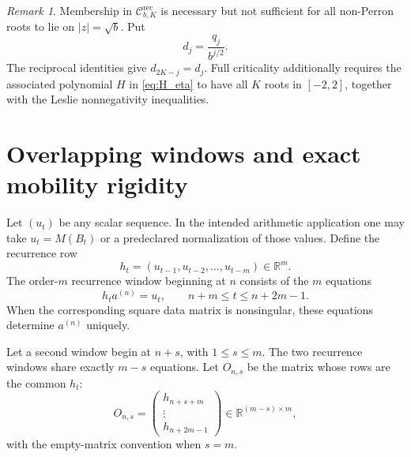 \documentclass[11pt]{amsart}
\numberwithin{equation}{section}
\theoremstyle{plain}
\theoremstyle{definition}
\theoremstyle{remark}
\newtheorem{remark}[theorem]{Remark}
\begin{document}
\begin{remark}
\label{rem:reciprocal_not_full_critical}
Membership in $\mathcal C^{\mathrm{rec}}_{b,K}$ is necessary but not sufficient for all non-Perron roots to lie on $|z|=\sqrt b$.  Put
\begin{equation}
d_j=\frac{q_j}{b^{j/2}}.
\label{eq:d_from_q}
\end{equation}
The reciprocal identities give $d_{2K-j}=d_j$.  Full criticality additionally requires the associated polynomial $H$ in \eqref{eq:H_eta} to have all $K$ roots in $[-2,2]$, together with the Leslie nonnegativity inequalities.
\end{remark}

\section{Overlapping windows and exact mobility rigidity}
\label{sec:overlap_rigidity}

Let $(u_t)$ be any scalar sequence.  In the intended arithmetic application one may take $u_t=M(B_t)$ or a predeclared normalization of those values.  Define the recurrence row
\begin{equation}
h_t=(u_{t-1},u_{t-2},\ldots,u_{t-m})\in\mathbb R^m.
\label{eq:recurrence_row}
\end{equation}
The order-$m$ recurrence window beginning at $n$ consists of the $m$ equations
\begin{equation}
h_ta^{(n)}=u_t,
\qquad
n+m\leq t\leq n+2m-1.
\label{eq:window_recurrence_equations}
\end{equation}
When the corresponding square data matrix is nonsingular, these equations determine $a^{(n)}$ uniquely.

Let a second window begin at $n+s$, with $1\leq s\leq m$.  The two recurrence windows share exactly $m-s$ equations.  Let $O_{n,s}$ be the matrix whose rows are the common $h_t$:
\begin{equation}
O_{n,s}
=
\begin{pmatrix}
h_{n+s+m}\\
\vdots\\
h_{n+2m-1}
\end{pmatrix}
\in\mathbb R^{(m-s)\times m},
\label{eq:overlap_matrix}
\end{equation}
with the empty-matrix convention when $s=m$.
\end{document}
